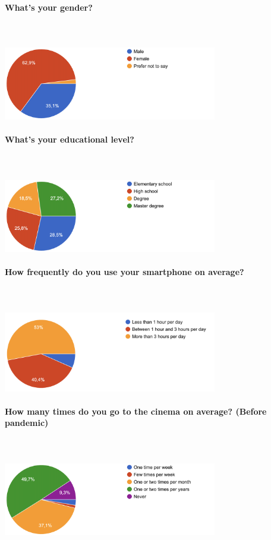 \documentclass[12pt, a4paper]{article}
\begin{document}
\paragraph{What's your gender?}\mbox{}\\\\
\includegraphics[width=0.7\textwidth]{Images/gender.png}\\

\paragraph{What's your educational level?}\mbox{}\\\\
\includegraphics[width=0.7\textwidth]{Images/education.png}\\

\paragraph{How frequently do you use your smartphone on average?}\mbox{}\\\\
\includegraphics[width=0.7\textwidth]{Images/timeAtPhone.png}\\

\paragraph{How many times do you go to the cinema on average? (Before pandemic)}\mbox{}\\\\
\includegraphics[width=0.7\textwidth]{Images/timeAtCinema.png}\\
\end{document}
